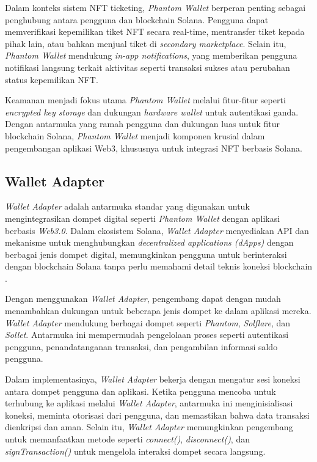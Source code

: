 Dalam konteks sistem NFT ticketing, \textit{Phantom Wallet} berperan penting sebagai penghubung antara pengguna dan blockchain Solana. Pengguna dapat memverifikasi kepemilikan tiket NFT secara real-time, mentransfer tiket kepada pihak lain, atau bahkan menjual tiket di \textit{secondary marketplace}. Selain itu, \textit{Phantom Wallet} mendukung \textit{in-app notifications}, yang memberikan pengguna notifikasi langsung terkait aktivitas seperti transaksi sukses atau perubahan status kepemilikan NFT.

Keamanan menjadi fokus utama \textit{Phantom Wallet} melalui fitur-fitur seperti \textit{encrypted key storage} dan dukungan \textit{hardware wallet} untuk autentikasi ganda. Dengan antarmuka yang ramah pengguna dan dukungan luas untuk fitur blockchain Solana, \textit{Phantom Wallet} menjadi komponen krusial dalam pengembangan aplikasi Web3, khususnya untuk integrasi NFT berbasis Solana.

\subsection{Wallet Adapter}

\textit{Wallet Adapter} adalah antarmuka standar yang digunakan untuk mengintegrasikan dompet digital seperti \textit{Phantom Wallet} dengan aplikasi berbasis \textit{Web3.0}. Dalam ekosistem Solana, \textit{Wallet Adapter} menyediakan API dan mekanisme untuk menghubungkan \textit{decentralized applications (dApps)} dengan berbagai jenis dompet digital, memungkinkan pengguna untuk berinteraksi dengan blockchain Solana tanpa perlu memahami detail teknis koneksi blockchain \parencite{ref9}.

Dengan menggunakan \textit{Wallet Adapter}, pengembang dapat dengan mudah menambahkan dukungan untuk beberapa jenis dompet ke dalam aplikasi mereka. \textit{Wallet Adapter} mendukung berbagai dompet seperti \textit{Phantom}, \textit{Solflare}, dan \textit{Sollet}. Antarmuka ini mempermudah pengelolaan proses seperti autentikasi pengguna, penandatanganan transaksi, dan pengambilan informasi saldo pengguna.

Dalam implementasinya, \textit{Wallet Adapter} bekerja dengan mengatur sesi koneksi antara dompet pengguna dan aplikasi. Ketika pengguna mencoba untuk terhubung ke aplikasi melalui \textit{Wallet Adapter}, antarmuka ini menginisialisasi koneksi, meminta otorisasi dari pengguna, dan memastikan bahwa data transaksi dienkripsi dan aman. Selain itu, \textit{Wallet Adapter} memungkinkan pengembang untuk memanfaatkan metode seperti \textit{connect()}, \textit{disconnect()}, dan \textit{signTransaction()} untuk mengelola interaksi dompet secara langsung.

